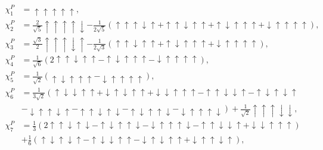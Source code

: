 \documentclass[prd,twocolumn,floatfix,nofootinbib]{revtex4}
\begin{document}
\begin{equation}
    \begin{aligned}
        \chi_{1}^{P} &= \uparrow\uparrow\uparrow\uparrow\uparrow, \\[3mm]
        \chi_{2}^{P} &= \frac{2}{\sqrt{5}}\uparrow\uparrow\uparrow\uparrow\downarrow
            -\frac{1}{2\sqrt{5}}\left(\uparrow\uparrow\uparrow\downarrow\uparrow + \uparrow\uparrow\downarrow\uparrow\uparrow
            +\uparrow\downarrow\uparrow\uparrow\uparrow + \downarrow\uparrow\uparrow\uparrow\uparrow\right), \\ 
        \chi_{3}^{P} &= \frac{\sqrt{3}}{2}\uparrow\uparrow\uparrow\downarrow\uparrow - \frac{1}{2\sqrt{3}}\left(\uparrow\uparrow\downarrow\uparrow\uparrow
            +\uparrow\downarrow\uparrow\uparrow\uparrow + \downarrow\uparrow\uparrow\uparrow\uparrow\right), \\ 
        \chi_{4}^{P} &= \frac{1}{\sqrt{6}}\left(2\uparrow\uparrow\downarrow\uparrow\uparrow - \uparrow\downarrow\uparrow\uparrow\uparrow 
            -\downarrow\uparrow\uparrow\uparrow\uparrow\right), \\ 
        \chi_{5}^{P} &= \frac{1}{\sqrt{2}}\left(\uparrow\downarrow\uparrow\uparrow\uparrow - \downarrow\uparrow\uparrow\uparrow\uparrow\right), \\ 
        \chi_{6}^{P} &= \frac{1}{3\sqrt{2}}\left(\uparrow\downarrow\downarrow\uparrow\uparrow + \downarrow\uparrow\downarrow\uparrow\uparrow
            +\downarrow\downarrow\uparrow\uparrow\uparrow - \uparrow\uparrow\downarrow\downarrow\uparrow
            -\uparrow\downarrow\uparrow\downarrow\uparrow \right. \\
            &\left. -\downarrow\uparrow\uparrow\downarrow\uparrow
            -\uparrow\uparrow\downarrow\uparrow\downarrow - \uparrow\downarrow\uparrow\uparrow\downarrow
            -\downarrow\uparrow\uparrow\uparrow\downarrow\right)
            +\frac{1}{\sqrt{2}}\uparrow\uparrow\uparrow\downarrow\downarrow, \\ 
        \chi_{7}^{P} &= \frac{1}{3}\left(2\uparrow\uparrow\downarrow\uparrow\downarrow - \uparrow\downarrow\uparrow\uparrow\downarrow
            -\downarrow\uparrow\uparrow\uparrow\downarrow - \uparrow\uparrow\downarrow\downarrow\uparrow + \downarrow\downarrow\uparrow\uparrow\uparrow\right) \\
            &+\frac{1}{6}\left(\uparrow\downarrow\uparrow\downarrow\uparrow - \uparrow\downarrow\downarrow\uparrow\uparrow
            -\downarrow\uparrow\downarrow\uparrow\uparrow + \downarrow\uparrow\uparrow\downarrow\uparrow\right), \\ 

\end{aligned}
\end{equation}
\end{document}
